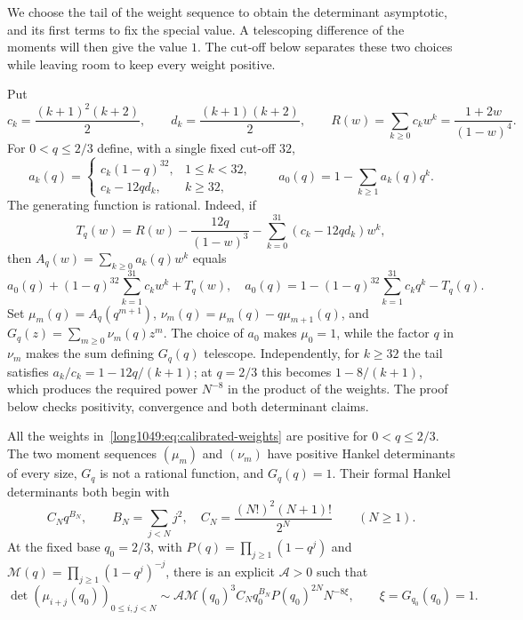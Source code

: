 \documentclass[11pt]{article}
\begin{document}
We choose the tail of the weight sequence to obtain the determinant
asymptotic, and its first terms to fix the special value. A telescoping
difference of the moments will then give the value $1$. The cut-off
below separates these two choices while leaving room to keep every
weight positive.

Put
\[
 c_k=\frac{(k+1)^2(k+2)}2,\qquad
 d_k=\frac{(k+1)(k+2)}2,\qquad
 R(w)=\sum_{k\ge0}c_kw^k=\frac{1+2w}{(1-w)^4}.
\]
For $0<q\le2/3$ define, with a single fixed cut-off $32$,
\begin{equation}\label{long1049:eq:calibrated-weights}
 a_k(q)=\begin{cases}
 c_k(1-q)^{32},&1\le k<32,\\
 c_k-12q d_k,&k\ge32,
 \end{cases}
 \qquad a_0(q)=1-\sum_{k\ge1}a_k(q)q^k.
\end{equation}
The generating function is rational. Indeed, if
\[
 T_q(w)=R(w)-\frac{12q}{(1-w)^3}
            -\sum_{k=0}^{31}(c_k-12qd_k)w^k,
\]
then $A_q(w)=\sum_{k\ge0}a_k(q)w^k$ equals
\[
 a_0(q)+(1-q)^{32}\sum_{k=1}^{31}c_kw^k+T_q(w),\quad
 a_0(q)=1-(1-q)^{32}\sum_{k=1}^{31}c_kq^k-T_q(q).
\]
Set $\mu_m(q)=A_q(q^{m+1})$, $\nu_m(q)=\mu_m(q)-q\mu_{m+1}(q)$,
and $G_q(z)=\sum_{m\ge0}\nu_m(q)z^m$.
The choice of $a_0$ makes $\mu_0=1$, while the factor $q$ in
$\nu_m$ makes the sum defining $G_q(q)$ telescope. Independently,
for $k\ge32$ the tail satisfies $a_k/c_k=1-12q/(k+1)$;
at $q=2/3$ this becomes $1-8/(k+1)$, which produces the required
power $N^{-8}$ in the product of the weights. The proof below checks
positivity, convergence and both determinant claims.

\begin{remark}
\label{long1049:thm:calibrated-model}
All the weights in~\eqref{long1049:eq:calibrated-weights} are positive
for $0<q\le2/3$. The two moment sequences $(\mu_m)$ and $(\nu_m)$
have positive Hankel determinants of every size, $G_q$ is not a rational
function, and
$G_q(q)=1$.  Their formal Hankel determinants both begin with
\[
 C_Nq^{B_N},\qquad B_N=\sum_{j<N}j^2,\quad
 C_N=\frac{(N!)^2(N+1)!}{2^N}\qquad(N\ge1).
\]
At the fixed base $q_0=2/3$, with
$P(q)=\prod_{j\ge1}(1-q^j)$ and
$\mathcal M(q)=\prod_{j\ge1}(1-q^j)^{-j}$,
there is an explicit $\mathcal A>0$ such that
\[
 \det(\mu_{i+j}(q_0))_{0\le i,j<N}
 \sim\mathcal A\mathcal M(q_0)^3 C_Nq_0^{B_N}
             P(q_0)^{2N}N^{-8\xi},\qquad \xi=G_{q_0}(q_0)=1.
\]
\end{remark}
\end{document}
